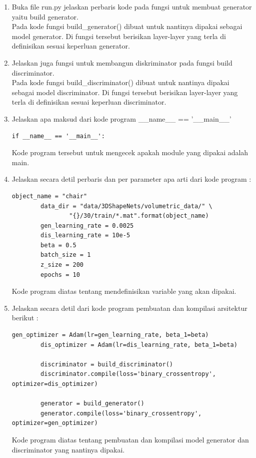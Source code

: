 \begin{enumerate}
	\item Buka file run.py jelaskan perbaris kode pada fungsi untuk membuat generator yaitu build generator.\\
	Pada kode fungsi build\_generator() dibuat untuk nantinya dipakai sebagai model generator. Di fungsi tersebut berisikan layer-layer yang terla di definisikan sesuai keperluan generator.
	
	\item Jelaskan juga fungsi untuk membangun diskriminator pada fungsi build discriminator.\\
	Pada kode fungsi build\_discriminator() dibuat untuk nantinya dipakai sebagai model discriminator. Di fungsi tersebut berisikan layer-layer yang terla di definisikan sesuai keperluan discriminator.
	
	\item Jelaskan apa maksud dari kode program \_\_name\_\_ == '\_\_main\_\_'
    \begin{lstlisting}[caption=Kode program utama,label={lst:8.1}]
    if __name__ == '__main__':
    \end{lstlisting}
    Kode program tersebut untuk mengecek apakah module yang dipakai adalah main.
    
    \item Jelaskan secara detil perbaris dan per parameter apa arti dari kode program :
    \begin{lstlisting}[caption=Setting Parameter,label={lst:8.2}]
        object_name = "chair"
        data_dir = "data/3DShapeNets/volumetric_data/" \
                "{}/30/train/*.mat".format(object_name)
        gen_learning_rate = 0.0025
        dis_learning_rate = 10e-5
        beta = 0.5
        batch_size = 1
        z_size = 200
        epochs = 10
    \end{lstlisting}
    Kode program diatas tentang mendefinisikan variable yang akan dipakai.
    
    \item Jelaskan secara detil dari kode program pembuatan dan kompilasi arsitektur berikut :
    \begin{lstlisting}[caption=Setting Parameter,label={lst:8.2}]
        gen_optimizer = Adam(lr=gen_learning_rate, beta_1=beta)
        dis_optimizer = Adam(lr=dis_learning_rate, beta_1=beta)

        discriminator = build_discriminator()
        discriminator.compile(loss='binary_crossentropy', optimizer=dis_optimizer)

        generator = build_generator()
        generator.compile(loss='binary_crossentropy', optimizer=gen_optimizer)
    \end{lstlisting}
    Kode program diatas tentang pembuatan dan kompilasi model generator dan discriminator yang nantinya dipakai.
    

\end{enumerate}
